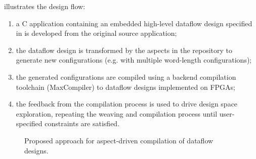  illustrates the design flow:
\begin{enumerate}
\item a C application containing an embedded high-level dataflow
  design specified in \FAST{} is developed from the original source
  application;
\item the dataflow design is transformed by the aspects in the
  repository to generate new configurations (e.g. with multiple
  word-length configurations);
\item the generated configurations are compiled using a backend
  compilation toolchain (MaxCompiler) to dataflow designs
  implemented on FPGAs;
\item the feedback from the compilation process is used to drive
  design space exploration, repeating the weaving and compilation
  process until user-specified constraints are satisfied.
\end{enumerate}

\begin{figure}[!ht]
  \centering
  \def\svgwidth{0.8\linewidth}
  
  \caption{Proposed approach for aspect-driven compilation of dataflow
   designs.}
  \label{fig:design-flow}
\end{figure}